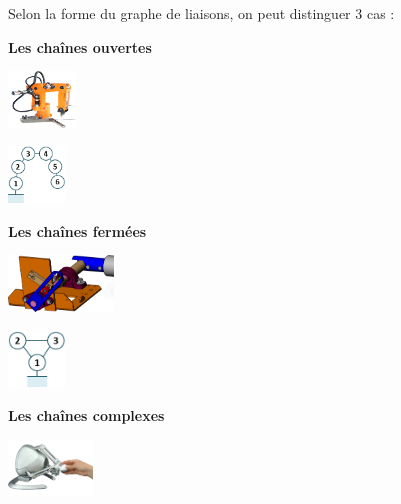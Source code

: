 \documentclass[10pt,fleqn]{article} %
\begin{document}
\begin{defi}
Selon la forme du graphe de liaisons, on peut distinguer 3 cas :
\begin{multicols}{3}
\begin{center}
\textbf{Les chaînes ouvertes} 
\end{center}

\begin{center}
\includegraphics[height=1.5cm]{images/ericc_01}

\vspace{.5cm}

\includegraphics[height=1.5cm]{images/ericc_02}
\end{center}

\begin{center}
\textbf{Les chaînes fermées} 
\end{center}

\begin{center}
\includegraphics[height=1.5cm]{images/sympact_01}

\vspace{.5cm}

\includegraphics[height=1.5cm]{images/sympact_02}
\end{center}

\begin{center}
\textbf{Les chaînes complexes} 
\end{center}

\begin{center}
\includegraphics[height=1.5cm]{images/haptique_01}


\end{center}
\end{multicols}
\end{defi}
\end{document}
